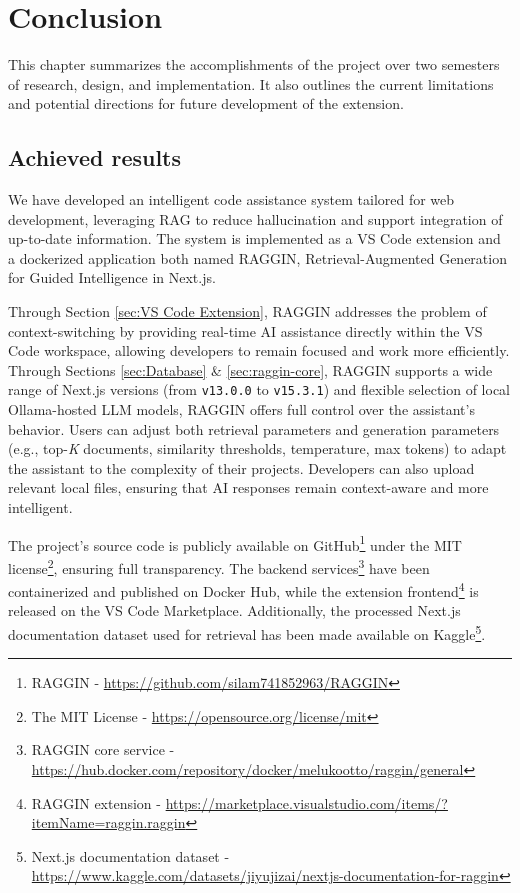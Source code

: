 \chapter{Conclusion}

This chapter summarizes the accomplishments of the project over two semesters of research, design, and implementation. It also outlines the current limitations and potential directions for future development of the extension.

\section{Achieved results}

We have developed an intelligent code assistance system tailored for web development, leveraging RAG to reduce hallucination and support integration of up-to-date information. The system is implemented as a VS Code extension and a dockerized application both named RAGGIN, Retrieval-Augmented Generation for Guided Intelligence in Next.js.

Through Section \ref{sec:VS Code Extension}, RAGGIN addresses the problem of context-switching by providing real-time AI assistance directly within the VS Code workspace, allowing developers to remain focused and work more efficiently. Through Sections \ref{sec:Database} \& \ref{sec:raggin-core}, RAGGIN supports a wide range of Next.js versions (from \texttt{v13.0.0} to \texttt{v15.3.1}) and flexible selection of local Ollama-hosted LLM models, RAGGIN offers full control over the assistant’s behavior. Users can adjust both retrieval parameters and generation parameters (e.g., top-\textit{K} documents, similarity thresholds, temperature, max tokens) to adapt the assistant to the complexity of their projects. Developers can also upload relevant local files, ensuring that AI responses remain context-aware and more intelligent.

The project's source code is publicly available on GitHub\footnote{RAGGIN - \url{https://github.com/silam741852963/RAGGIN}} under the MIT license\footnote{The MIT License - \url{https://opensource.org/license/mit}}, ensuring full transparency. The backend services\footnote{RAGGIN core service - \url{https://hub.docker.com/repository/docker/melukootto/raggin/general}} have been containerized and published on Docker Hub, while the extension frontend\footnote{RAGGIN extension - \url{https://marketplace.visualstudio.com/items/?itemName=raggin.raggin}} is released on the VS Code Marketplace. Additionally, the processed Next.js documentation dataset used for retrieval has been made available on Kaggle\footnote{Next.js documentation dataset - \url{https://www.kaggle.com/datasets/jiyujizai/nextjs-documentation-for-raggin}}.

